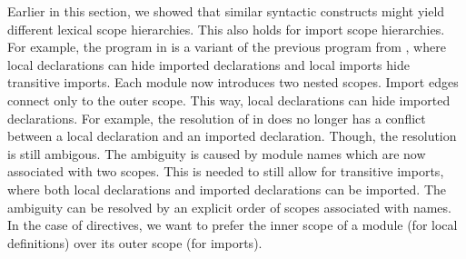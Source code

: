 Earlier in this section, we showed that similar syntactic constructs might yield different lexical scope hierarchies.
This also holds for import scope hierarchies.
For example, the program in  is a variant of the previous program from ,
  where local declarations can hide imported declarations and local imports hide transitive imports.
Each module now introduces two nested scopes.
Import edges connect only to the outer scope.
This way, local declarations can hide imported declarations.
For example, 
  the resolution of  in  
  does no longer has a conflict between a local declaration and an imported declaration.
Though, the resolution is still ambigous.
The ambiguity is caused by module names which are now associated with two scopes.
This is needed to still allow for transitive imports, 
  where both local declarations and imported declarations can be imported.
The ambiguity can be resolved by an explicit order of scopes associated with names.
In the case of  directives, we want to prefer the inner scope of a module (for local definitions) 
  over its outer scope (for imports).

